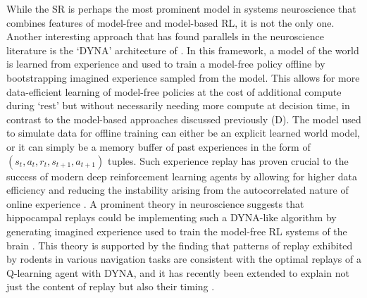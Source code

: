 While the SR is perhaps the most prominent model in systems neuroscience that combines features of model-free and model-based RL, it is not the only one.
Another interesting approach that has found parallels in the neuroscience literature is the `DYNA' architecture of \citet{sutton1991dyna}.
In this framework, a model of the world is learned from experience and used to train a model-free policy offline by bootstrapping imagined experience sampled from the model.
This allows for more data-efficient learning of model-free policies at the cost of additional compute during `rest' but without necessarily needing more compute at decision time, in contrast to the model-based approaches discussed previously (D).
The model used to simulate data for offline training can either be an explicit learned world model, or it can simply be a memory buffer of past experiences in the form of $(s_t, a_t, r_t, s_{t+1}, a_{t+1})$ tuples.
Such experience replay has proven crucial to the success of modern deep reinforcement learning agents by allowing for higher data efficiency and reducing the instability arising from the autocorrelated nature of online experience \citep{mnih2013playing,schaul2015prioritized}.
A prominent theory in neuroscience suggests that hippocampal replays could be implementing such a DYNA-like algorithm by generating imagined experience used to train the model-free RL systems of the brain \citep{mattar2018prioritized}.
This theory is supported by the finding that patterns of replay exhibited by rodents in various navigation tasks are consistent with the optimal replays of a Q-learning agent with DYNA, and it has recently been extended to explain not just the content of replay but also their timing \citep{agrawal2022temporal}.
